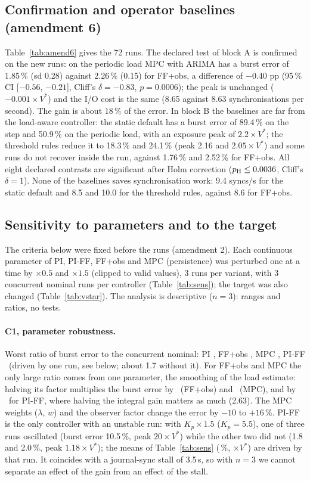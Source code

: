 \documentclass[smallextended]{svjour3}
\begin{document}
\subsection{Confirmation and operator baselines (amendment 6)}\label{sec:amend6}
Table~\ref{tab:amend6} gives the 72 runs. The declared test of block A is confirmed on the new runs: on the periodic load MPC with ARIMA has a burst error of 1.85\,\% (sd 0.28) against 2.26\,\% (0.15) for FF+obs, a difference of $-0.40$ pp (95\,\% CI [$-0.56$, $-0.21$], Cliff's $\delta=-0.83$, $p=0.0006$); the peak is unchanged ($-0.001\times V^*$) and the I/O cost is the same (8.65 against 8.63 synchronisations per second). The gain is about 18\,\% of the error. In block B the baselines are far from the load-aware controller: the static default has a burst error of 89.4\,\% on the step and 50.9\,\% on the periodic load, with an exposure peak of $2.2\times V^*$; the threshold rules reduce it to 18.3\,\% and 24.1\,\% (peak 2.16 and $2.05\times V^*$) and some runs do not recover inside the run, against 1.76\,\% and 2.52\,\% for FF+obs. All eight declared contrasts are significant after Holm correction ($p_{\rm H}\le0.0036$, Cliff's $\delta=1$). None of the baselines saves synchronisation work: 9.4 syncs/s for the static default and 8.5 and 10.0 for the threshold rules, against 8.6 for FF+obs.

\subsection{Sensitivity to parameters and to the target}\label{sec:sens}
The criteria below were fixed before the runs (amendment 2). Each continuous parameter of PI, PI-FF, FF+obs and MPC (persistence) was perturbed one at a time by $\times0.5$ and $\times1.5$ (clipped to valid values), 3 runs per variant, with 3 concurrent nominal runs per controller
(Table~\ref{tab:sens}); the target was also changed (Table~\ref{tab:vstar}). The analysis is descriptive ($n=3$): ranges and ratios, no tests.
\paragraph{C1, parameter robustness.}
Worst ratio of burst error to the concurrent nominal: PI \SensWorstPIT, FF+obs \SensWorstFFO, MPC \SensWorstMPCP, PI-FF \SensWorstPIFF\ (driven by one run, see below; about 1.7 without it). For FF+obs and MPC the only large ratio comes from one parameter, the smoothing of the load estimate:
halving its factor multiplies the burst error by \SensSmoothFFO\ (FF+obs) and \SensSmoothMPCP\ (MPC), and by \SensSmoothPIFF\ for PI-FF, where halving the integral gain matters as much (2.63). The MPC weights ($\lambda$, $w$) and the observer factor change the error by $-10$ to $+16$\,\%.
PI-FF is the only controller with an unstable run: with $K_p\times1.5$ ($K_p=5.5$), one of three runs oscillated (burst error 10.5\,\%, peak $20\times V^*$) while the other two did not (1.8 and 2.0\,\%, peak $1.18\times V^*$); the means of Table~\ref{tab:sens} (\SensPIFFkpErr\,\%, \SensPIFFkpPeak$\times V^*$) are driven by that run. It coincides with a journal-sync stall of 3.5\,s, so with $n=3$ we cannot separate an effect of the gain from an effect of the stall.
\end{document}
